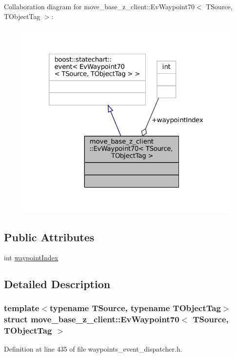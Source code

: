 Collaboration diagram for move\+\_\+base\+\_\+z\+\_\+client\+:\+:Ev\+Waypoint70$<$ T\+Source, T\+Object\+Tag $>$\+:
\nopagebreak
\begin{figure}[H]
\begin{center}
\leavevmode
\includegraphics[width=320pt]{structmove__base__z__client_1_1EvWaypoint70__coll__graph}
\end{center}
\end{figure}
\subsection*{Public Attributes}
\begin{DoxyCompactItemize}
\item 
int \hyperlink{structmove__base__z__client_1_1EvWaypoint70_a6a6bda02c61be16b97d69eceff0caef7}{waypoint\+Index}
\end{DoxyCompactItemize}


\subsection{Detailed Description}
\subsubsection*{template$<$typename T\+Source, typename T\+Object\+Tag$>$\newline
struct move\+\_\+base\+\_\+z\+\_\+client\+::\+Ev\+Waypoint70$<$ T\+Source, T\+Object\+Tag $>$}



Definition at line 435 of file waypoints\+\_\+event\+\_\+dispatcher.\+h.



